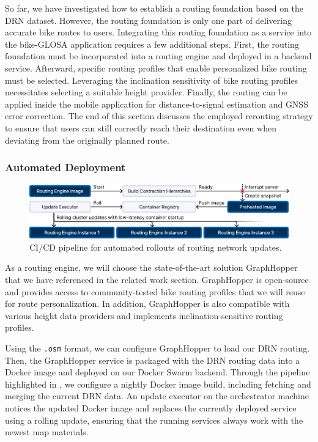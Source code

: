 So far, we have investigated how to establish a routing foundation based on the DRN dataset. However, the routing foundation is only one part of delivering accurate bike routes to users. Integrating this routing foundation as a service into the bike-GLOSA application requires a few additional steps. First, the routing foundation must be incorporated into a routing engine and deployed in a backend service. Afterward, specific routing profiles that enable personalized bike routing must be selected. Leveraging the inclination sensitivity of bike routing profiles necessitates selecting a suitable height provider. Finally, the routing can be applied inside the mobile application for distance-to-signal estimation and GNSS error correction. The end of this section discusses the employed rerouting strategy to ensure that users can still correctly reach their destination even when deviating from the originally planned route.

\subsubsection{Automated Deployment}

\begin{figure}[b]
\centering
\includegraphics[width=\linewidth]{images/load-distribution-containerization-preheating.pdf}
\caption{CI/CD pipeline for automated rollouts of routing network updates.}
\label{fig:multi-stage-continuous-deployment}
\end{figure}

As a routing engine, we will choose the state-of-the-art solution GraphHopper that we have referenced in the related work section. GraphHopper is open-source and provides access to community-tested bike routing profiles that we will reuse for route personalization. In addition, GraphHopper is also compatible with various height data providers and implements inclination-sensitive routing profiles. 

Using the \texttt{.osm} format, we can configure GraphHopper to load our DRN routing. Then, the GraphHopper service is packaged with the DRN routing data into a Docker image and deployed on our Docker Swarm backend. Through the pipeline highlighted in , we configure a nightly Docker image build, including fetching and merging the current DRN data. An update executor on the orchestrator machine notices the updated Docker image and replaces the currently deployed service using a rolling update, ensuring that the running services always work with the newest map materials. 

